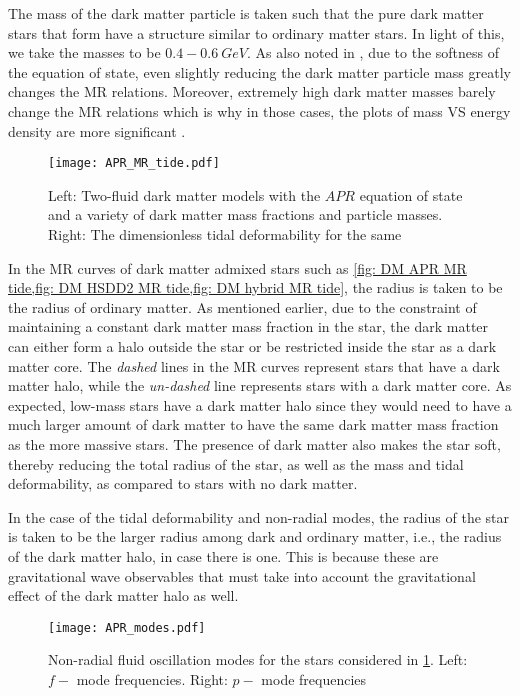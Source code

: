\documentclass[a4paper,12pt,onehalfspacing]{report}
\begin{document}
The mass of the dark matter particle is taken such that the pure dark matter stars that form have a structure similar to ordinary matter stars. In light of this, we take the masses to be $0.4-0.6\ GeV$. As also noted in \cite{Kwing_Leung_DM_tide}, due to the softness of the equation of state, even slightly reducing the dark matter particle mass greatly changes the MR relations. Moreover, extremely high dark matter masses barely change the MR relations which is why in those cases, the plots of mass VS energy density are more significant \cite{Payel_M_DM}. 

\begin{figure}[ht]
    \centering
    \texttt{[image: APR\_MR\_tide.pdf]}
    \caption{Left: Two-fluid dark matter models with the $APR$ equation of state and a variety of dark matter mass fractions and particle masses. Right: The dimensionless tidal deformability for the same}
    \label{fig: DM APR MR tide}
\end{figure}

In the MR curves of dark matter admixed stars such as \cref{fig: DM APR MR tide,fig: DM HSDD2 MR tide,fig: DM hybrid MR tide}, the radius is taken to be the radius of ordinary matter. As mentioned earlier, due to the constraint of maintaining a constant dark matter mass fraction in the star, the dark matter can either form a halo outside the star or be restricted inside the star as a dark matter core. The \emph{dashed} lines in the MR curves represent stars that have a dark matter halo, while the \emph{un-dashed} line represents stars with a dark matter core. As expected, low-mass stars have a dark matter halo since they would need to have a much larger amount of dark matter to have the same dark matter mass fraction as the more massive stars. The presence of dark matter also makes the star soft, thereby reducing the total radius of the star, as well as the mass and tidal deformability, as compared to stars with no dark matter. 

In the case of the tidal deformability and non-radial modes, the radius of the star is taken to be the larger radius among dark and ordinary matter, i.e., the radius of the dark matter halo, in case there is one. This is because these are gravitational wave observables that must take into account the gravitational effect of the dark matter halo as well. 

\begin{figure}[ht]
    \centering
    \texttt{[image: APR\_modes.pdf]}
    \caption{Non-radial fluid oscillation modes for the stars considered in \cref{fig: DM APR MR tide}. Left: $f-$ mode frequencies. Right: $p-$ mode frequencies}
    \label{fig: DM APR modes}
\end{figure}
\end{document}
